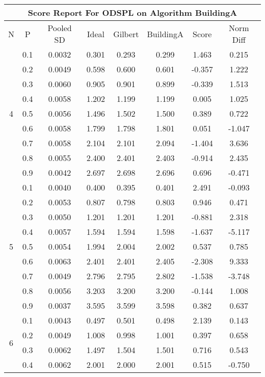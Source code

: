 \documentclass[11pt,a4paper]{report}
\begin{document}
\begin{longtable}{ | c | c || c | c | c | c | c | c | }
\hline
\multicolumn{8}{|c|}{ Score Report For ODSPL on Algorithm BuildingA} \\
\hline
N & P & Pooled SD &  Ideal &  Gilbert & BuildingA  & Score & Norm Diff \\
 \hline
 \hline
 \endhead
\multirow{9}{*}{4} & 0.1 & 0.0032 & 0.301 & 0.293 & 0.299 & 1.463 & 0.215 \\
 & 0.2 & 0.0049 & 0.598 & 0.600 & 0.601 & -0.357 & 1.222 \\
 & 0.3 & 0.0060 & 0.905 & 0.901 & 0.899 & -0.339 & 1.513 \\
 & 0.4 & 0.0058 & 1.202 & 1.199 & 1.199 & 0.005 & 1.025 \\
 & 0.5 & 0.0056 & 1.496 & 1.502 & 1.500 & 0.389 & 0.722 \\
 & 0.6 & 0.0058 & 1.799 & 1.798 & 1.801 & 0.051 & -1.047 \\
 & 0.7 & 0.0058 & 2.104 & 2.101 & 2.094 & -1.404 & 3.636 \\
 & 0.8 & 0.0055 & 2.400 & 2.401 & 2.403 & -0.914 & 2.435 \\
 & 0.9 & 0.0042 & 2.697 & 2.698 & 2.696 & 0.696 & -0.471 \\
 \hline
\multirow{9}{*}{5} & 0.1 & 0.0040 & 0.400 & 0.395 & 0.401 & 2.491 & -0.093 \\
 & 0.2 & 0.0053 & 0.807 & 0.798 & 0.803 & 0.946 & 0.471 \\
 & 0.3 & 0.0050 & 1.201 & 1.201 & 1.201 & -0.881 & 2.318 \\
 & 0.4 & 0.0057 & 1.594 & 1.594 & 1.598 & -1.637 & -5.117 \\
 & 0.5 & 0.0054 & 1.994 & 2.004 & 2.002 & 0.537 & 0.785 \\
 & 0.6 & 0.0063 & 2.401 & 2.401 & 2.405 & -2.308 & 9.333 \\
 & 0.7 & 0.0049 & 2.796 & 2.795 & 2.802 & -1.538 & -3.748 \\
 & 0.8 & 0.0056 & 3.203 & 3.200 & 3.200 & -0.144 & 1.008 \\
 & 0.9 & 0.0037 & 3.595 & 3.599 & 3.598 & 0.382 & 0.637 \\
 \hline
\multirow{9}{*}{6} & 0.1 & 0.0043 & 0.497 & 0.501 & 0.498 & 2.139 & 0.143 \\
 & 0.2 & 0.0049 & 1.008 & 0.998 & 1.001 & 0.397 & 0.658 \\
 & 0.3 & 0.0062 & 1.497 & 1.504 & 1.501 & 0.716 & 0.543 \\
 & 0.4 & 0.0062 & 2.001 & 2.000 & 2.001 & 0.515 & -0.750 \\

\end{longtable}
\end{document}
